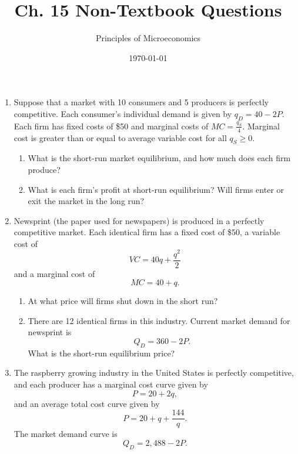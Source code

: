 \documentclass{article}
\title{Ch. 15 Non-Textbook Questions}
\author{Principles of Microeconomics}
\date{\today}
\begin{document}
\maketitle

\begin{enumerate}

\item Suppose that a market with 10 consumers and 5 producers is perfectly competitive. Each consumer's individual demand is given by $q_D = 40 - 2P$. Each firm has fixed costs of \$50 and marginal costs of $MC = \frac{q_S}{4}$. Marginal cost is greater than or equal to average variable cost for all $q_S \geq 0$.

	\begin{enumerate}
	
	\item What is the short-run market equilibrium, and how much does each firm produce?
	
	\item What is each firm's profit at short-run equilibrium? Will firms enter or exit the market in the long run?
	
	\end{enumerate}

\item Newsprint (the paper used for newspapers) is produced in a perfectly competitive market. Each identical firm has a fixed cost of \$50, a variable cost of
	\begin{equation*}
	VC = 40q + \frac{q^2}{2}
	\end{equation*}
	and a marginal cost of
	\begin{equation*}
	MC = 40 + q.
	\end{equation*}
	
	\begin{enumerate}
	
	\item At what price will firms shut down in the short run?
	
	\item There are 12 identical firms in this industry. Current market demand for newsprint is
		\begin{equation*}
		Q_D = 360 - 2P.
		\end{equation*}
		What is the short-run equilibrium price?
		
	\end{enumerate}

\item The raspberry growing industry in the United States is perfectly competitive, and each producer has a marginal cost curve given by
	\begin{equation*}
	P = 20 + 2q,
	\end{equation*}
	and an average total cost curve given by
	\begin{equation*}
	P = 20 + q + \frac{144}{q}.
	\end{equation*}
	The market demand curve is
	\begin{equation*}
	Q_D = 2,488 - 2P.
	\end{equation*}
	

\end{enumerate}
\end{document}
